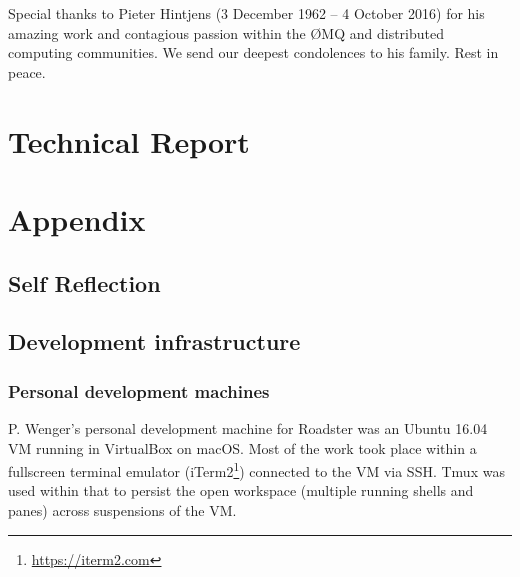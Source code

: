 \documentclass[a4paper]{report}
\newcommand\zmq{{\O}MQ\xspace}
\begin{document}
Special thanks to Pieter Hintjens {\textdagger} (3 December 1962 -- 4 October
2016) for his amazing work and contagious passion within the \zmq and
distributed computing communities. We send our deepest condolences to his
family. Rest in peace.


\setcounter{tocdepth}{3}
\tableofcontents
\listoffigures
\listoftables
\listoflistings

\pagebreak
{}
\setcounter{page}{1}
\setcounter{secnumdepth}{3}



\part{Technical Report}







\printbibliography
\printglossaries

\appendix
\part{Appendix}
\chapter{Self Reflection}


\chapter{Development infrastructure}
\section{Personal development machines}
P. Wenger's personal development machine for Roadster was an Ubuntu 16.04 VM
running in VirtualBox on macOS. Most of the work took place within a fullscreen terminal
emulator (iTerm2\footnote{\url{https://iterm2.com}}) connected to the VM via SSH. Tmux was used within that to
persist the open workspace (multiple running shells and panes) across
suspensions of the VM.
\end{document}
